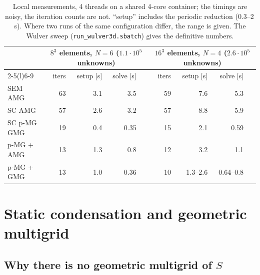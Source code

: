 \documentclass[11pt]{article}
\newcommand{\code}[1]{\texttt{#1}}
\begin{document}
\begin{table}[H]
\centering\small
\begin{tabular}{@{}lrrrrrrrr@{}}
\toprule
 & \multicolumn{4}{c}{$8^3$ elements, $N=6$ ($1.1\cdot10^5$ unknowns)} & \multicolumn{4}{c}{$16^3$ elements, $N=4$ ($2.6\cdot10^5$ unknowns)}\\
\cmidrule(lr){2-5}\cmidrule(l){6-9}
 & iters & setup [s] & solve [s] & & iters & setup [s] & solve [s] & \\
\midrule
SEM AMG     & 63 & 3.1 & 3.5 & & 59 & 7.6 & 5.3 & \\
SC AMG      & 57 & 2.6 & 3.2 & & 57 & 8.8 & 5.9 & \\
SC p-MG GMG & 19 & 0.4 & 0.35 & & 15 & 2.1 & 0.59 & \\
p-MG + AMG  & 13 & 1.3 & 0.8 & & 12 & 3.2 & 1.1 & \\
p-MG + GMG  & 13 & 1.0 & 0.36 & & 10 & 1.3--2.6 & 0.64--0.8 & \\
\bottomrule
\end{tabular}
\caption{Local measurements, 4 threads on a shared 4-core container; the timings are noisy, the iteration
counts are not. ``setup'' includes the periodic reduction (0.3--2\,s). Where two runs of the same
configuration differ, the range is given. The Wulver sweep (\code{run\_wulver3d.sbatch}) gives the definitive numbers.}
\end{table}

\section{Static condensation and geometric multigrid}\label{sec:noscgmg}

\subsection{Why there is no geometric multigrid of $S$}
\end{document}
